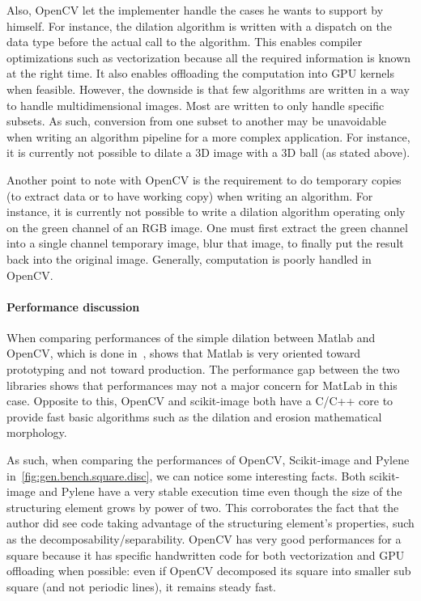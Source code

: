Also, OpenCV let the implementer handle the cases he wants to support by himself. For instance, the dilation algorithm
is written with a dispatch on the data type before the actual call to the algorithm. This enables compiler optimizations
such as vectorization because all the required information is known at the right time. It also enables offloading the
computation into GPU kernels when feasible. However, the downside is that few algorithms are written in a way to handle
multidimensional images. Most are written to only handle specific subsets. As such, conversion from one subset to
another may be unavoidable when writing an algorithm pipeline for a more complex application. For instance, it is
currently not possible to dilate a 3D image with a 3D ball (as stated above).

Another point to note with OpenCV is the requirement to do temporary copies (to extract data or to have working copy)
when writing an algorithm. For instance, it is currently not possible to write a dilation algorithm operating only on
the green channel of an RGB image. One must first extract the green channel into a single channel temporary image, blur
that image, to finally put the result back into the original image. Generally,  computation is poorly
handled in OpenCV.

\paragraph{Performance discussion} When comparing performances of the simple dilation between Matlab and OpenCV, which
is done in~\cite{matuska.2012.bench}, shows that Matlab is very oriented toward prototyping and not toward production.
The performance gap between the two libraries shows that performances may not a major concern for MatLab in this case.
Opposite to this, OpenCV and scikit-image both have a C/C++ core to provide fast basic algorithms such as the dilation
and erosion mathematical morphology.

As such, when comparing the performances of OpenCV, Scikit-image and Pylene in~\cref{fig:gen.bench.square.disc}, we can
notice some interesting facts. Both scikit-image and Pylene have a very stable execution time even though the size of
the structuring element grows by power of two. This corroborates the fact that the author did see code taking advantage
of the structuring element's properties, such as the decomposability/separability. OpenCV has very good performances for
a square because it has specific handwritten code for both vectorization and GPU offloading when possible: even if
OpenCV decomposed its square into smaller sub square (and not periodic lines), it remains steady fast.

